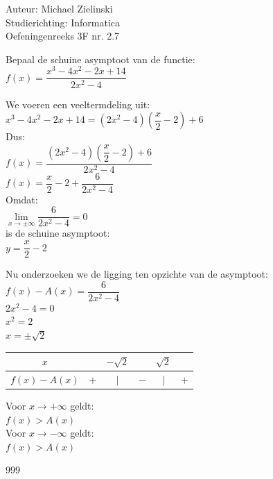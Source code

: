\documentclass[a4paper]{article}
\begin{document}
  
\noindent \large Auteur: Michael Zielinski \\
\noindent \large Studierichting: Informatica\\
\noindent \large Oefeningenreeks 3F nr. 2.7\\

\medskip

\normalsize

Bepaal de schuine asymptoot van de functie: \\

$ f(x) = \dfrac{x^3 - 4x^2 - 2x + 14}{2x^2 - 4} $ \\

\bigskip

We voeren een veeltermdeling uit: \\

$ x^3 - 4x^2 - 2x + 14 = \left(2x^2 - 4\right)\left(\dfrac{x}{2} - 2\right) + 6 $ \\

Dus: \\

$ f(x) = \dfrac{\left(2x^2 - 4\right)\left(\dfrac{x}{2} - 2\right) + 6}{2x^2 - 4} $ \\

$ f(x) = \dfrac{x}{2} - 2 + \dfrac{6}{2x^2 - 4} $ \\

Omdat: \\

$ \lim\limits_{x \to \pm\infty} \dfrac{6}{2x^2 - 4} = 0 $ \\

is de schuine asymptoot: \\

$ y = \dfrac{x}{2} - 2 $ \\

\bigskip

Nu onderzoeken we de ligging ten opzichte van de asymptoot: \\

$ f(x) - A(x) = \dfrac{6}{2x^2 - 4} $ \\

$ 2x^2 - 4 = 0 $ \\

$ x^2 = 2 $ \\

$ x = \pm\sqrt{2} $ \\

\bigskip

\begin{tabular}{c|ccccc}
$x$ &  & $-\sqrt{2}$ &  & $\sqrt{2}$ &  \\ \hline
$f(x) - A(x)$ & $+$ & $|$ & $-$ & $|$ & $+$ \\
\end{tabular}

\bigskip

Voor $x \to +\infty$ geldt: \\

$ f(x) > A(x) $ \\

Voor $x \to -\infty$ geldt: \\

$ f(x) > A(x) $ \\

\begin{thebibliography}{999}
\end{thebibliography}
\end{document}
